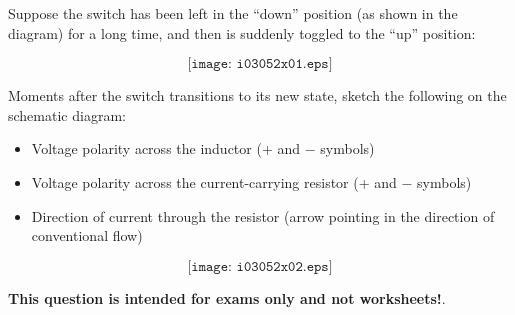 

Suppose the switch has been left in the ``down'' position (as shown in the diagram) for a long time, and then is suddenly toggled to the ``up'' position:

$$\texttt{[image: i03052x01.eps]}$$

Moments after the switch transitions to its new state, sketch the following on the schematic diagram:

\begin{itemize}
\item{} Voltage polarity across the inductor (+ and $-$ symbols)
\vskip 5pt
\item{} Voltage polarity across the current-carrying resistor (+ and $-$ symbols)
\vskip 5pt
\item{} Direction of current through the resistor (arrow pointing in the direction of conventional flow)
\end{itemize}







$$\texttt{[image: i03052x02.eps]}$$







{\bf This question is intended for exams only and not worksheets!}.


